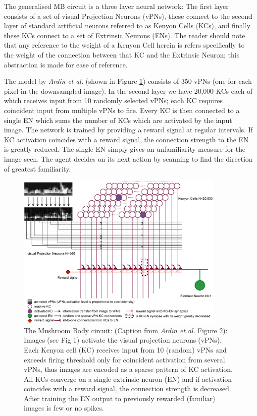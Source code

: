 \documentclass[a4paper,12pt,twoside,openright]{article}
\begin{document}
The generalised MB circuit is a three layer neural network: The first layer consists of a set of
visual Projection Neurons (vPNs), these connect to the second layer of standard artificial neurons
referred to as Kenyon Cells (KCs), and finally these KCs connect to a set of Extrinsic Neurons (ENs).
The reader should note that any reference to the weight of a Kenyon Cell herein is refers specifically
to the weight of the connection between that KC and the Extrinsic Neuron; this abstraction is made for
ease of reference.
\newline

The model by \textit{Ardin et al.} (shown in Figure \ref{fig:ardinmb}) consists of 350 vPNs
(one for each pixel in the downsampled image). In the second layer we have 20,000 KCs each of
which receives input from 10 randomly selected vPNs; each KC requires coincident input from multiple
vPNs to fire. Every KC is then connected to a single EN which sums the number of KCs which are
activated by the input image. The network is trained by providing a reward signal at regular
intervals. If KC activation coincides with a reward signal, the connection strength to the EN is
greatly reduced. The single EN simply gives an unfamiliarity measure for the image seen. The agent
decides on its next action by scanning to find the direction of greatest familiarity.
\newline

\begin{figure}
  \centering
  \includegraphics[width=0.9\textwidth]{Ardin2010MBModel}
  \caption{
    \label{fig:ardinmb} The Mushroom Body circuit: (Caption from \textit{Ardin et al.} Figure 2):
    Images (see Fig 1) activate the visual projection neurons (vPNs). Each Kenyon cell (KC) receives
    input from 10 (random) vPNs and exceeds firing threshold only for coincident activation from
    several vPNs, thus images are encoded as a sparse pattern of KC activation. All KCs converge on
    a single extrinsic neuron (EN) and if activation coincides with a reward signal, the connection
    strength is decreased. After training the EN output to previously rewarded (familiar) images is
    few or no spikes.
  }
\end{figure}
\end{document}
